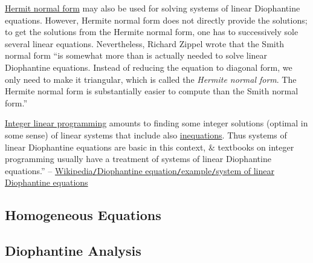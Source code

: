 \documentclass{article}
\numberwithin{equation}{section}
\begin{document}
\href{https://en.wikipedia.org/wiki/Hermite_normal_form}{Hermit normal form} may also be used for solving systems of linear Diophantine equations. However, Hermite normal form does not directly provide the solutions; to get the solutions from the Hermite normal form, one has to successively sole several linear equations. Nevertheless, Richard Zippel wrote that the Smith normal form ``is somewhat more than is actually needed to solve linear Diophantine equations. Instead of reducing the equation to diagonal form, we only need to make it triangular, which is called the \textit{Hermite normal form}. The Hermite normal form is substantially easier to compute than the Smith normal form.''

\href{https://en.wikipedia.org/wiki/Integer_linear_programming}{Integer linear programming} amounts to finding some integer solutions (optimal in some sense) of linear systems that include also \href{https://en.wikipedia.org/wiki/Inequation}{inequations}. Thus systems of linear Diophantine equations are basic in this context, \& textbooks on integer programming usually have a treatment of systems of linear Diophantine equations.'' -- \href{https://en.wikipedia.org/wiki/Diophantine_equation#System_of_linear_Diophantine_equations}{Wikipedia\texttt{/}Diophantine equation\texttt{/}example\texttt{/}system of linear Diophantine equations}

\subsection{Homogeneous Equations}

\subsection{Diophantine Analysis}
\end{document}
